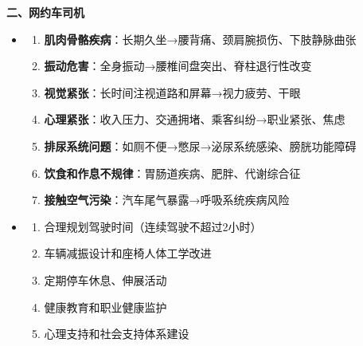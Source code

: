 \begin{keybox}
\textbf{二、网约车司机}
\begin{itemize}[leftmargin=*]
    \item {}
    \begin{enumerate}[leftmargin=*]
        \item \textbf{肌肉骨骼疾病}：长期久坐→腰背痛、颈肩腕损伤、下肢静脉曲张
        \item \textbf{振动危害}：全身振动→腰椎间盘突出、脊柱退行性改变
        \item \textbf{视觉紧张}：长时间注视道路和屏幕→视力疲劳、干眼
        \item \textbf{心理紧张}：收入压力、交通拥堵、乘客纠纷→职业紧张、焦虑
        \item \textbf{排尿系统问题}：如厕不便→憋尿→泌尿系统感染、膀胱功能障碍
        \item \textbf{饮食和作息不规律}：胃肠道疾病、肥胖、代谢综合征
        \item \textbf{接触空气污染}：汽车尾气暴露→呼吸系统疾病风险
    \end{enumerate}
    \item {}
    \begin{enumerate}[leftmargin=*]
        \item 合理规划驾驶时间（连续驾驶不超过2小时）
        \item 车辆减振设计和座椅人体工学改进
        \item 定期停车休息、伸展活动
        \item 健康教育和职业健康监护
        \item 心理支持和社会支持体系建设
    \end{enumerate}
\end{itemize}


\end{keybox}

